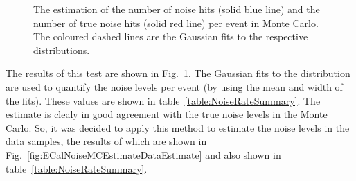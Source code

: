 \begin{figure}%
  \centering
  \caption{The estimation of the number of noise hits (solid blue line) and the number of true noise hits (solid red line) per event in Monte Carlo.  The coloured dashed lines are the Gaussian fits to the respective distributions.}
  \label{fig:ECalNoiseMCEstimateMCTrue}
\end{figure}
The results of this test are shown in Fig.~\ref{fig:ECalNoiseMCEstimateMCTrue}.  The Gaussian fits to the distribution are used to quantify the noise levels per event (by using the mean and width of the fits).  These values are shown in table~\ref{table:NoiseRateSummary}.  The estimate is clealy in good agreement with the true noise levels in the Monte Carlo.  So, it was decided to apply this method to estimate the noise levels in the data samples, the results of which are shown in Fig.~\ref{fig:ECalNoiseMCEstimateDataEstimate} and also shown in table~\ref{table:NoiseRateSummary}.
